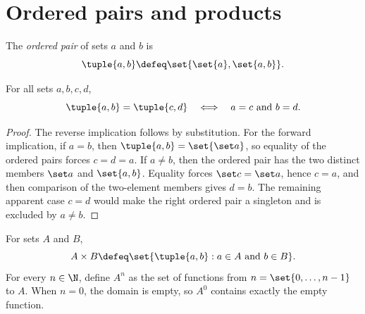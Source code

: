 \section{Ordered pairs and products}
\label{sec:set-prerequisites-02}

\begin{definition}
The \emph{ordered pair} of sets \(a\) and \(b\) is
\[
  \tuple{a,b}\defeq\set{\set{a},\set{a,b}}.
\]
\end{definition}

\begin{lemma}
For all sets \(a,b,c,d\),
\[
  \tuple{a,b}=\tuple{c,d}
  \quad\Longleftrightarrow\quad
  a=c\text{ and }b=d.
\]
\end{lemma}
\begin{proof}
The reverse implication follows by substitution.  For the forward implication,
if \(a=b\), then \(\tuple{a,b}=\set{\set a}\), so equality of the ordered
pairs forces \(c=d=a\).  If \(a\neq b\), then the ordered pair has the two
distinct members \(\set a\) and \(\set{a,b}\).  Equality forces
\(\set c=\set a\), hence \(c=a\), and then comparison of the two-element
members gives \(d=b\).  The remaining apparent case \(c=d\) would make the
right ordered pair a singleton and is excluded by \(a\neq b\).
\end{proof}

\begin{definition}
For sets \(A\) and \(B\),
\[
  A\times B\defeq\set{\tuple{a,b}:a\in A\text{ and }b\in B}.
\]
For every \(n\in\N\), define \(A^n\) as the set of functions from
\(n=\set{0,\ldots,n-1}\) to \(A\).  When \(n=0\), the domain is empty, so
\(A^0\) contains exactly the empty function.
\end{definition}

